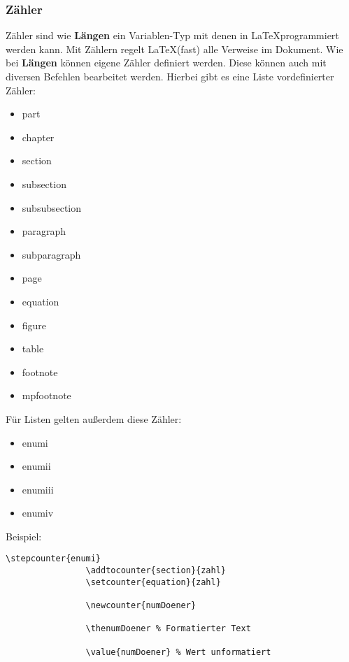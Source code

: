 \documentclass[10pt]{article}  %
\begin{document}
        \subsubsection{Zähler}
            Zähler sind wie \textbf{Längen} ein Variablen-Typ mit denen in \LaTeX \@ programmiert werden kann. Mit Zählern regelt \LaTeX \@ (fast) alle Verweise im Dokument. Wie bei \textbf{Längen} können eigene Zähler definiert werden.
            Diese können auch mit diversen Befehlen bearbeitet werden. Hierbei gibt es eine Liste vordefinierter Zähler:
            \begin{itemize}
                \item part
                \item chapter
                \item section
                \item subsection
                \item subsubsection
                \item paragraph
                \item subparagraph
                \item page
                \item equation
                \item figure
                \item table
                \item footnote
                \item mpfootnote
            \end{itemize}
            Für Listen gelten außerdem diese Zähler:
            \begin{itemize}
                \item enumi
                \item enumii
                \item enumiii
                \item enumiv
            \end{itemize}
            Beispiel:
            \lstset{language=TeX}
            \begin{lstlisting}[frame=single]
                \stepcounter{enumi}
                \addtocounter{section}{zahl}
                \setcounter{equation}{zahl}

                \newcounter{numDoener}

                \thenumDoener % Formatierter Text

                \value{numDoener} % Wert unformatiert
            \end{lstlisting}
\end{document}
